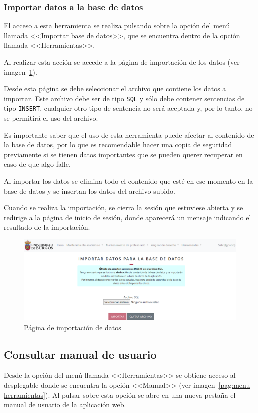 \subsubsection{Importar datos a la base de datos}
El acceso a esta herramienta se realiza pulsando sobre la opción del menú llamada <<Importar base de datos>>, que se encuentra dentro de la opción llamada <<Herramientas>>.

Al realizar esta acción se accede a la página de importación de los datos (ver imagen~\ref{pag:importar}).

Desde esta página se debe seleccionar el archivo que contiene los datos a importar.
Este archivo debe ser de tipo \texttt{SQL} y sólo debe contener sentencias de tipo \texttt{INSERT}, cualquier otro tipo de sentencia no será aceptada y, por lo tanto, no se permitirá el uso del archivo.

Es importante saber que el uso de esta herramienta puede afectar al contenido de la base de datos, por lo que es recomendable hacer una copia de seguridad previamente si se tienen datos importantes que se pueden querer recuperar en caso de que algo falle.

Al importar los datos se elimina todo el contenido que esté en ese momento en la base de datos y se insertan los datos del archivo subido.

Cuando se realiza la importación, se cierra la sesión que estuviese abierta y se redirige a la página de inicio de sesión, donde aparecerá un mensaje indicando el resultado de la importación.

\begin{figure}
	\centering
	\includegraphics[width=\textwidth]{../img/Anexos/Manual usuario/importar.png}
	\caption{Página de importación de datos}\label{pag:importar}
\end{figure}

\subsection{Consultar manual de usuario}
Desde la opción del menú llamada <<Herramientas>> se obtiene acceso al desplegable donde se encuentra la opción <<Manual>> (ver imagen~\ref{pag:menu herramientas}).
Al pulsar sobre esta opción se abre en una nueva pestaña el manual de usuario de la aplicación web.

